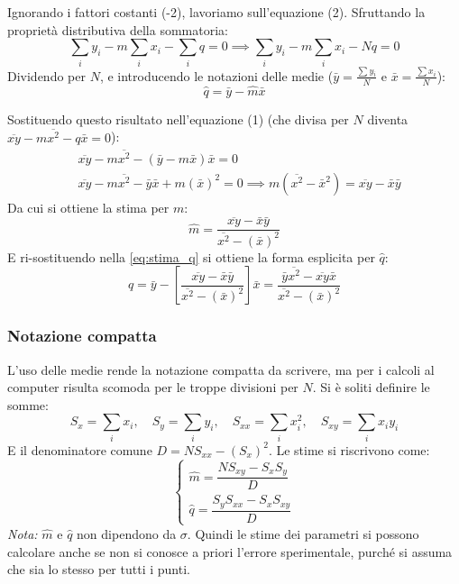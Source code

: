 \documentclass[openany,a4paper,12pt]{book}
\theoremstyle{remark}
\begin{document}
Ignorando i fattori costanti (-2), lavoriamo sull'equazione (2). Sfruttando la proprietà distributiva della sommatoria:
\begin{equation*}
    \sum_i y_i - m \sum_i x_i - \sum_i q = 0 \implies \sum_i y_i - m \sum_i x_i - Nq = 0
\end{equation*}
Dividendo per $N$, e introducendo le notazioni delle medie ($\bar{y} = \frac{\sum y_i}{N}$ e $\bar{x} = \frac{\sum x_i}{N}$):
\begin{equation}
    \hat{q} = \bar{y} - \hat{m}\bar{x}
    \label{eq:stima_q}
\end{equation}

Sostituendo questo risultato nell'equazione (1) (che divisa per $N$ diventa $\overline{xy} - m\overline{x^2} - q\bar{x} = 0$):
\begin{align*}
    &\overline{xy} - m\overline{x^2} - (\bar{y} - m\bar{x})\bar{x} = 0 \\
    &\overline{xy} - m\overline{x^2} - \bar{y}\bar{x} + m(\bar{x})^2 = 0 \implies m(\overline{x^2} - \bar{x}^2) = \overline{xy} - \bar{x}\bar{y}
\end{align*}
Da cui si ottiene la stima per $m$:
\begin{equation}
    \hat{m} = \frac{\overline{xy} - \bar{x}\bar{y}}{\overline{x^2} - (\bar{x})^2}
\end{equation}
E ri-sostituendo nella \eqref{eq:stima_q} si ottiene la forma esplicita per $\hat{q}$:
\begin{equation}
    \hat{q} = \bar{y} - \left[ \frac{\overline{xy} - \bar{x}\bar{y}}{\overline{x^2} - (\bar{x})^2} \right] \bar{x} = \frac{\bar{y}\overline{x^2} - \overline{xy}\bar{x}}{\overline{x^2} - (\bar{x})^2}
\end{equation}

\subsubsection{Notazione compatta}
L'uso delle medie rende la notazione compatta da scrivere, ma per i calcoli al computer risulta scomoda per le troppe divisioni per $N$. Si è soliti definire le somme:
\[
S_x = \sum_i x_i, \quad S_y = \sum_i y_i, \quad S_{xx} = \sum_i x_i^2, \quad S_{xy} = \sum_i x_i y_i
\]
E il denominatore comune $D = N S_{xx} - (S_x)^2$. Le stime si riscrivono come:
\begin{equation}
    \begin{cases}
        \hat{m} = \dfrac{N S_{xy} - S_x S_y}{D} \\[3ex]
        \hat{q} = \dfrac{S_y S_{xx} - S_x S_{xy}}{D}
    \end{cases}
\end{equation}
\textit{Nota:} $\hat{m}$ e $\hat{q}$ non dipendono da $\sigma$. Quindi le stime dei parametri si possono calcolare anche se non si conosce a priori l'errore sperimentale, purché si assuma che sia lo stesso per tutti i punti.
\end{document}
